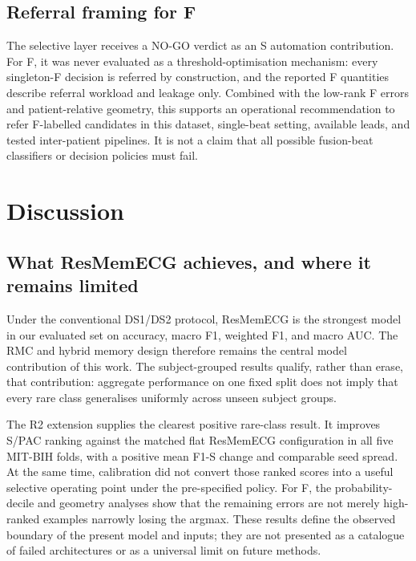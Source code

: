 \documentclass[review,12pt]{elsarticle}
\begin{document}
\subsection{Referral framing for F}
The selective layer receives a NO-GO verdict as an S automation contribution.
For F, it was never evaluated as a threshold-optimisation mechanism: every
singleton-F decision is referred by construction, and the reported F quantities
describe referral workload and leakage only. Combined with the low-rank F errors
and patient-relative geometry, this supports an operational recommendation to
refer F-labelled candidates in this dataset, single-beat setting, available
leads, and tested inter-patient pipelines. It is not a claim that all possible
fusion-beat classifiers or decision policies must fail.
\section{Discussion}
\subsection{What ResMemECG achieves, and where it remains limited}
Under the conventional DS1/DS2 protocol, ResMemECG is the strongest model in
our evaluated set on accuracy, macro F1, weighted F1, and macro AUC. The RMC and
hybrid memory design therefore remains the central model contribution of this
work. The subject-grouped results qualify, rather than erase, that contribution:
aggregate performance on one fixed split does not imply that every rare class
generalises uniformly across unseen subject groups.

The R2 extension supplies the clearest positive rare-class result. It improves
S/PAC ranking against the matched flat ResMemECG configuration in all five
MIT-BIH folds, with a positive mean F1-S change and comparable seed spread. At
the same time, calibration did not convert those ranked scores into a useful
selective operating point under the pre-specified policy. For F, the probability-
decile and geometry analyses show that the remaining errors are not merely
high-ranked examples narrowly losing the argmax. These results define the
observed boundary of the present model and inputs; they are not presented as a
catalogue of failed architectures or as a universal limit on future methods.
\end{document}
